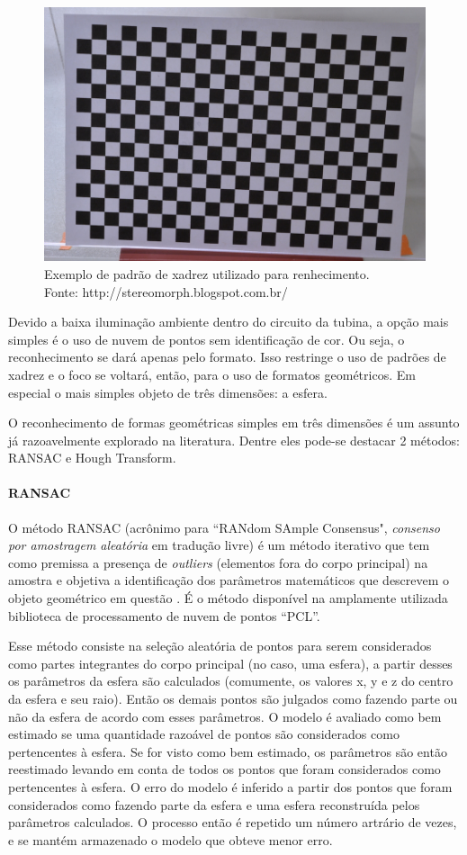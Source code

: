 \begin{figure}[h!]
   \centering
   \includegraphics[width=0.8\columnwidth]{detail/figs/localizacao/checkerboard_rec}
   \caption{Exemplo de padrão de xadrez utilizado para renhecimento.\\ Fonte:
   http://stereomorph.blogspot.com.br/}
   \label{fig::checkerboard_rec}
\end{figure}


Devido a baixa iluminação ambiente dentro do circui\-to da tubina, a opção
mais simples é o uso de nu\-vem de pontos sem identificação de cor. Ou seja, o
reconhecimento se dará apenas pelo formato. Isso restringe o uso de padrões de
xadrez e o foco se voltará, então, para o uso de formatos geométricos. Em
especial o mais simples objeto de três dimensões: a esfera.

O reconhecimento de formas geométricas simples em três dimensões é um assunto
já razoavelmente explorado na literatura. Dentre eles pode-se destacar 2
métodos: RANSAC e Hough Transform.

\paragraph{RANSAC}
O método RANSAC (acrônimo para ``RANdom SAmple Consensus", \textit{consenso por
amostragem aleatória} em tradução livre) é um método iterativo que tem como
premissa a presença de \textit{outliers} (elementos fora do corpo principal) na
amostra e objetiva a identificação dos parâmetros matemáticos que descrevem o
objeto geométrico em questão \cite{ransac}. É o método
disponível na amplamente utilizada biblioteca de processamento de nuvem de pontos ``PCL''. 

Esse método consiste na seleção aleatória de pontos para serem considerados como
partes integrantes do corpo principal (no caso, uma esfera), a partir desses os
parâmetros da esfera são calculados (comumente, os valores x, y e z do centro
da esfera e seu raio). Então os demais pontos são julgados como fazendo parte ou
não da esfera de acordo com esses parâmetros. O modelo é avaliado como bem estimado se uma quantidade razoável de pontos são considerados
como pertencentes à esfera. Se for visto como bem estimado, os parâmetros são
então reestimado levando em conta de todos os pontos que foram considerados como
pertencentes à esfera. O erro do modelo é inferido a partir dos pontos que foram
considerados como fazendo parte da esfera e uma esfera reconstruída pelos
parâmetros calculados. O processo então é repetido um número artrário de vezes,
e se mantém armazenado o modelo que obteve menor erro.


